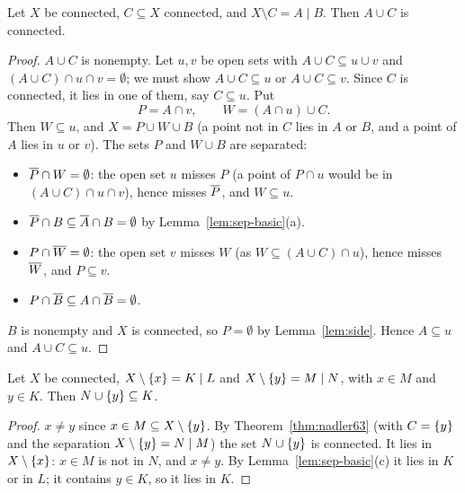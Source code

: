 
\begin{theorem}\label{thm:nadler63}
Let $X$ be connected, $C\subseteq X$ connected, and $X\setminus C=A\mid B$. Then $A\cup C$ is
connected.
\end{theorem}

\begin{proof}
$A\cup C$ is nonempty. Let $u,v$ be open sets with $A\cup C\subseteq u\cup v$ and $(A\cup C)\cap u\cap
v=\emptyset$; we must show $A\cup C\subseteq u$ or $A\cup C\subseteq v$. Since $C$ is connected, it lies
in one of them, say $C\subseteq u$. Put
\[
P=A\cap v,\qquad W=(A\cap u)\cup C .
\]
Then $W\subseteq u$, and $X=P\cup W\cup B$ (a point not in $C$ lies in $A$ or $B$, and a point of $A$ lies
in $u$ or $v$). The sets $P$ and $W\cup B$ are separated:
\begin{itemize}
\item $\overline{P}\cap W=\emptyset$: the open set $u$ misses $P$ (a point of $P\cap u$ would be in $(A\cup
C)\cap u\cap v$), hence misses $\overline{P}$, and $W\subseteq u$.
\item $\overline{P}\cap B\subseteq\overline{A}\cap B=\emptyset$ by Lemma~\ref{lem:sep-basic}(a).
\item $P\cap\overline{W}=\emptyset$: the open set $v$ misses $W$ (as $W\subseteq(A\cup C)\cap u$), hence misses
$\overline{W}$, and $P\subseteq v$.
\item $P\cap\overline{B}\subseteq A\cap\overline{B}=\emptyset$.
\end{itemize}
$B$ is nonempty and $X$ is connected, so $P=\emptyset$ by Lemma~\ref{lem:side}. Hence $A\subseteq u$ and
$A\cup C\subseteq u$.
\end{proof}


\begin{lemma}\label{lem:nadler64}
Let $X$ be connected, $X\setminus\left\{ x \right\}=K\mid L$ and $X\setminus\left\{ y \right\}=M\mid N$, with $x\in M$ and
$y\in K$. Then $N\cup\left\{ y \right\}\subseteq K$.
\end{lemma}

\begin{proof}
$x\ne y$ since $x\in M\subseteq X\setminus\left\{ y \right\}$. By Theorem~\ref{thm:nadler63} (with $C=\left\{ y \right\}$ and the
separation $X\setminus\left\{ y \right\}=N\mid M$) the set $N\cup\left\{ y \right\}$ is connected. It lies in $X\setminus\left\{ x \right\}$: $x\in M$ is not in $N$, and $x\neq y$. By Lemma~\ref{lem:sep-basic}(c) it lies in $K$ or in $L$; it
contains $y\in K$, so it lies in $K$.
\end{proof}

